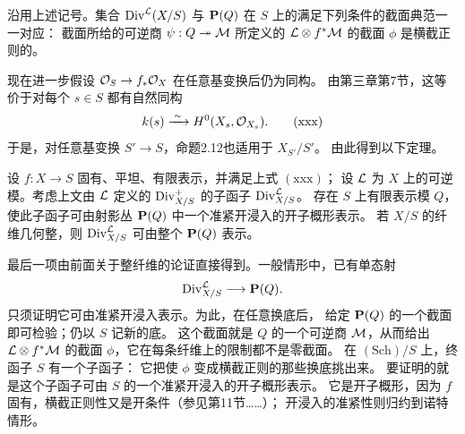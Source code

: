 
沿用上述记号。集合 \(\operatorname{Div}^{\mathcal L}(X/S)\) 与 \(\mathbf P(Q)\) 在 \(S\) 上的满足下列条件的截面典范一一对应：
截面所给的可逆商 \(\psi:Q\twoheadrightarrow\mathcal M\) 所定义的
\(\mathcal L\otimes f^*\mathcal M\) 的截面 \(\phi\) 是横截正则的。

现在进一步假设 \(\mathcal O_S\to f_*\mathcal O_X\) 在任意基变换后仍为同构。
由第三章第7节，这等价于对每个 \(s\in S\) 都有自然同构
\begin{equation}
 k(s)\xrightarrow{\;\sim\;} H^0(X_s,\mathcal O_{X_s}).
 \tag{xxx}
\end{equation}
于是，对任意基变换 \(S'\to S\)，命题2.12也适用于 \(X_{S'}/S'\)。
由此得到以下定理。



设 \(f:X\to S\) 固有、平坦、有限表示，并满足上式 \((\mathrm{xxx})\)；
设 \(\mathcal L\) 为 \(X\) 上的可逆模。考虑上文由 \(\mathcal L\) 定义的
\(\operatorname{Div}^+_{X/S}\) 的子函子 \(\operatorname{Div}^{\mathcal L}_{X/S}\)。
存在 \(S\) 上有限表示模 \(Q\)，使此子函子可由射影丛
\(\mathbf P(Q)\) 中一个准紧开浸入的开子概形表示。
若 \(X/S\) 的纤维几何整，则 \(\operatorname{Div}^{\mathcal L}_{X/S}\) 可由整个
\(\mathbf P(Q)\) 表示。

最后一项由前面关于整纤维的论证直接得到。一般情形中，已有单态射
\[
 \operatorname{Div}^{\mathcal L}_{X/S}\longrightarrow\mathbf P(Q).
\]
只须证明它可由准紧开浸入表示。为此，在任意换底后，
给定 \(\mathbf P(Q)\) 的一个截面即可检验；仍以 \(S\) 记新的底。
这个截面就是 \(Q\) 的一个可逆商 \(\mathcal M\)，从而给出
\(\mathcal L\otimes f^*\mathcal M\) 的截面 \(\phi\)，它在每条纤维上的限制都不是零截面。
在 \((\mathrm{Sch})/S\) 上，终函子 \(S\) 有一个子函子：
它把使 \(\phi\) 变成横截正则的那些换底挑出来。
要证明的就是这个子函子可由 \(S\) 的一个准紧开浸入的开子概形表示。
它是开子概形，因为 \(f\) 固有，横截正则性又是开条件（参见第11节……）；
开浸入的准紧性则归约到诺特情形。
\par\endgroup
